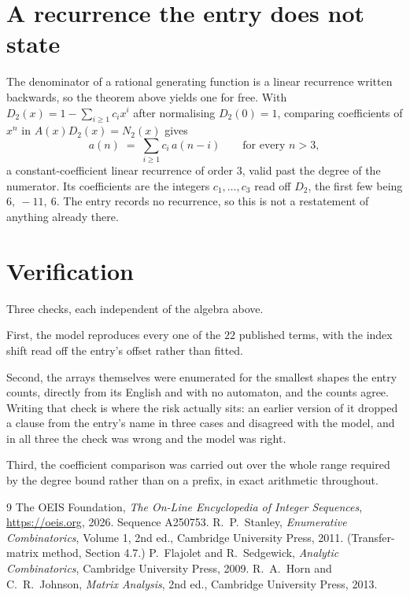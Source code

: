\documentclass[11pt,a4paper]{article}
\theoremstyle{plain}
\theoremstyle{definition}
\begin{document}
\section{A recurrence the entry does not state}

The denominator of a rational generating function is a linear recurrence written backwards, so
the theorem above yields one for free. With $D_2(x)=1-\sum_{i\ge1}c_ix^i$ after normalising
$D_2(0)=1$, comparing coefficients of $x^n$ in $A(x)D_2(x)=N_2(x)$ gives
\[
a(n)\;=\;\sum_{i\ge1}c_i\,a(n-i)\qquad\text{for every }n>3,
\]
a constant-coefficient linear recurrence of order $3$, valid past the degree of the
numerator. Its coefficients are the integers $c_1,\dots,c_{3}$ read off $D_2$, the first few being $6,\ -11,\ 6$. The entry records no recurrence, so this is not a restatement of anything
already there.

\section{Verification}

Three checks, each independent of the algebra above.

First, the model reproduces every one of the $22$ published terms, with the index shift
read off the entry's offset rather than fitted.

Second, the arrays themselves were enumerated for the smallest shapes the entry counts,
directly from its English and with no automaton, and the counts agree. Writing that check is
where the risk actually sits: an earlier version of it dropped a clause from the entry's name
in three cases and disagreed with the model, and in all three the check was wrong and the model
was right.

Third, the coefficient comparison was carried out over the whole range required by the degree
bound rather than on a prefix, in exact arithmetic throughout.

\begin{thebibliography}{9}
 The OEIS Foundation, \emph{The On-Line Encyclopedia of Integer
Sequences}, \url{https://oeis.org}, 2026. Sequence A250753.
 R.~P.~Stanley, \emph{Enumerative Combinatorics}, Volume 1, 2nd ed.,
Cambridge University Press, 2011. (Transfer-matrix method, Section 4.7.)
 P.~Flajolet and R.~Sedgewick, \emph{Analytic Combinatorics}, Cambridge
University Press, 2009.
 R.~A.~Horn and C.~R.~Johnson, \emph{Matrix Analysis}, 2nd ed., Cambridge
University Press, 2013.
\end{thebibliography}
\end{document}
